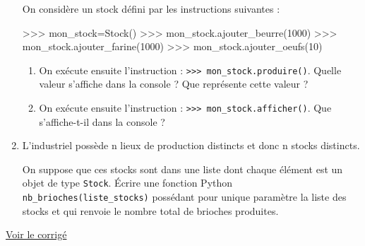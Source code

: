 \documentclass[
  a4paper,
  DIV=11,
  numbers=noendperiod]{scrartcl}
\newenvironment{Shaded}{\begin{snugshade}}{\end{snugshade}}
\newcommand{\DecValTok}[1]{\textcolor[rgb]{0.68,0.00,0.00}{#1}}
\newcommand{\NormalTok}[1]{\textcolor[rgb]{0.00,0.23,0.31}{#1}}
\newcommand{\OperatorTok}[1]{\textcolor[rgb]{0.37,0.37,0.37}{#1}}
\providecommand{\tightlist}{%
  \setlength{\itemsep}{0pt}\setlength{\parskip}{0pt}}\usepackage{longtable,booktabs,array}
\begin{document}
\begin{enumerate}
  On considère un stock défini par les instructions suivantes :

\begin{Shaded}
\begin{Highlighting}[]
\OperatorTok{\textgreater{}\textgreater{}\textgreater{}}\NormalTok{ mon\_stock}\OperatorTok{=}\NormalTok{Stock()}
\OperatorTok{\textgreater{}\textgreater{}\textgreater{}}\NormalTok{ mon\_stock.ajouter\_beurre(}\DecValTok{1000}\NormalTok{) }
\OperatorTok{\textgreater{}\textgreater{}\textgreater{}}\NormalTok{ mon\_stock.ajouter\_farine(}\DecValTok{1000}\NormalTok{) }
\OperatorTok{\textgreater{}\textgreater{}\textgreater{}}\NormalTok{ mon\_stock.ajouter\_oeufs(}\DecValTok{10}\NormalTok{)}
\end{Highlighting}
\end{Shaded}

  \begin{enumerate}
  \def\labelenumii{\arabic{enumii}.}
  \tightlist
  \item
    On exécute ensuite l'instruction :
    \texttt{\textgreater{}\textgreater{}\textgreater{}\ mon\_stock.produire()}.
    Quelle valeur s'affiche dans la console ? Que représente cette
    valeur ?
  \item
    On exécute ensuite l'instruction :
    \texttt{\textgreater{}\textgreater{}\textgreater{}\ mon\_stock.afficher()}.
    Que s'affiche-t-il dans la console ?
  \end{enumerate}
\item
  L'industriel possède n lieux de production distincts et donc n stocks
  distincts.

  On suppose que ces stocks sont dans une liste dont chaque élément est
  un objet de type \texttt{Stock}. Écrire une fonction Python
  \texttt{nb\_brioches(liste\_stocks)} possédant pour unique paramètre
  la liste des stocks et qui renvoie le nombre total de brioches
  produites.
\end{enumerate}

\href{https://flallemand.fr/notebook/?from=https://flallemand.fr/nsi/assets/notebooks/exo4_POO_CORR.ipynb}{Voir
le corrigé}
\end{document}
